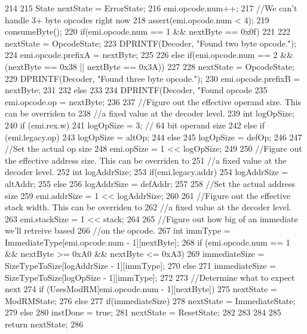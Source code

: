 \begin{DoxyCode}
214 {
215     State nextState = ErrorState;
216     emi.opcode.num++;
217     //We can't handle 3+ byte opcodes right now
218     assert(emi.opcode.num < 4);
219     consumeByte();
220     if(emi.opcode.num == 1 && nextByte == 0x0f)
221     {
222         nextState = OpcodeState;
223         DPRINTF(Decoder, "Found two byte opcode.\n");
224         emi.opcode.prefixA = nextByte;
225     }
226     else if(emi.opcode.num == 2 && (nextByte == 0x38 || nextByte == 0x3A))
227     {
228         nextState = OpcodeState;
229         DPRINTF(Decoder, "Found three byte opcode.\n");
230         emi.opcode.prefixB = nextByte;
231     }
232     else
233     {
234         DPRINTF(Decoder, "Found opcode %
235         emi.opcode.op = nextByte;
236 
237         //Figure out the effective operand size. This can be overriden to
238         //a fixed value at the decoder level.
239         int logOpSize;
240         if (emi.rex.w)
241             logOpSize = 3; // 64 bit operand size
242         else if (emi.legacy.op)
243             logOpSize = altOp;
244         else
245             logOpSize = defOp;
246 
247         //Set the actual op size
248         emi.opSize = 1 << logOpSize;
249 
250         //Figure out the effective address size. This can be overriden to
251         //a fixed value at the decoder level.
252         int logAddrSize;
253         if(emi.legacy.addr)
254             logAddrSize = altAddr;
255         else
256             logAddrSize = defAddr;
257 
258         //Set the actual address size
259         emi.addrSize = 1 << logAddrSize;
260 
261         //Figure out the effective stack width. This can be overriden to
262         //a fixed value at the decoder level.
263         emi.stackSize = 1 << stack;
264 
265         //Figure out how big of an immediate we'll retreive based
266         //on the opcode.
267         int immType = ImmediateType[emi.opcode.num - 1][nextByte];
268         if (emi.opcode.num == 1 && nextByte >= 0xA0 && nextByte <= 0xA3)
269             immediateSize = SizeTypeToSize[logAddrSize - 1][immType];
270         else
271             immediateSize = SizeTypeToSize[logOpSize - 1][immType];
272 
273         //Determine what to expect next
274         if (UsesModRM[emi.opcode.num - 1][nextByte]) {
275             nextState = ModRMState;
276         } else {
277             if(immediateSize) {
278                 nextState = ImmediateState;
279             } else {
280                 instDone = true;
281                 nextState = ResetState;
282             }
283         }
284     }
285     return nextState;
286 }
\end{DoxyCode}
